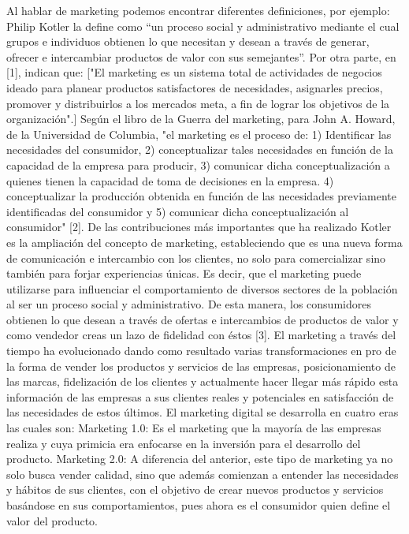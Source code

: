\documentclass[12pt]{difu100cia} %
\begin{document}
Al hablar de marketing podemos encontrar diferentes definiciones, por ejemplo: Philip Kotler la define como “un proceso social y administrativo mediante el cual grupos e individuos obtienen lo que necesitan y desean a través de generar, ofrecer e intercambiar productos de valor con sus semejantes”.
Por otra parte, en [1], indican que: ["El marketing es un sistema total de actividades de negocios ideado para planear productos satisfactores de necesidades, asignarles precios, promover y distribuirlos a los mercados meta, a fin de lograr los objetivos de la organización".]
Según el libro de la Guerra del marketing, para John A. Howard, de la Universidad de Columbia, {"el marketing es el proceso de: 1) Identificar las necesidades del consumidor, 2) conceptualizar tales necesidades en función de la capacidad de la empresa para producir, 3) comunicar dicha conceptualización a quienes tienen la capacidad de toma de decisiones en la empresa. 4) conceptualizar la producción obtenida en función de las necesidades previamente identificadas del consumidor y 5) comunicar dicha conceptualización al consumidor"} [2].
De las contribuciones más importantes que ha realizado Kotler es la ampliación del concepto de marketing, estableciendo que es una nueva forma de comunicación e intercambio con los clientes, no solo para comercializar sino también para forjar experiencias únicas. Es decir, que el marketing puede utilizarse para influenciar el comportamiento de diversos sectores de la población al ser un proceso social y administrativo. De esta manera, los consumidores obtienen lo que desean a través de ofertas e intercambios de productos de valor y como vendedor creas un lazo de fidelidad con éstos [3].  
El marketing a través del tiempo ha evolucionado dando como resultado varias transformaciones en pro de la forma de vender los productos y servicios de las empresas, posicionamiento de las marcas, fidelización de los clientes y actualmente hacer llegar más rápido esta información de las empresas a sus clientes reales y potenciales en satisfacción de las necesidades de estos últimos.
El marketing digital se desarrolla en cuatro eras las cuales son:
Marketing 1.0: Es el marketing que la mayoría de las empresas realiza y cuya primicia era enfocarse en la inversión para el desarrollo del producto. 
Marketing 2.0: A diferencia del anterior, este tipo de marketing ya no solo busca vender calidad, sino que además comienzan a entender las necesidades y hábitos de sus clientes, con el objetivo de crear nuevos productos y servicios basándose en sus comportamientos, pues ahora es el consumidor quien define el valor del producto. 
\end{document}
